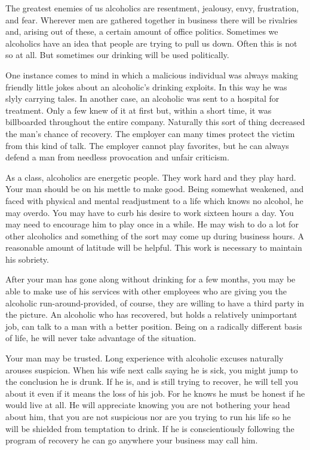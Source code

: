 \begin{biblechapter}
The greatest enemies of us alcoholics are resentment, jealousy, envy, frustration, and fear.  Wherever men are gathered together in business there will be rivalries and, arising out of these, a certain amount of office politics.  Sometimes we alcoholics have an idea that people are trying to pull us down.  Often this is not so at all.  But sometimes our drinking will be used politically.

One instance comes to mind in which a malicious individual was always making friendly little jokes about an alcoholic's drinking exploits.  In this way he was slyly carrying tales.  In another case, an alcoholic was sent to a hospital for treatment.  Only a few knew of it at first but, within a short time, it was billboarded throughout the entire company.  Naturally this sort of thing decreased the man's chance of recovery.  The employer can many times protect the victim from this kind of talk.  The employer cannot play favorites, but he can always defend a man from needless provocation and unfair criticism.

As a class, alcoholics are energetic people.  They work hard and they play hard.  Your man should be on his mettle to make good.  Being somewhat weakened, and faced with physical and mental readjustment to a life which knows no alcohol, he may overdo.  You may have to curb his desire to work sixteen hours a day.  You may need to encourage him to play once in a while.  He may wish to do a lot for other alcoholics and something of the sort may come up during business hours.  A reasonable amount of latitude will be helpful.  This work is necessary to maintain his sobriety.

After your man has gone along without drinking for a few months, you may be able to make use of his services with other employees who are giving you the alcoholic run-around-provided, of course, they are willing to have a third party in the picture.  An alcoholic who has recovered, but holds a relatively unimportant job, can talk to a man with a better position.  Being on a radically different basis of life, he will never take advantage of the situation.

Your man may be trusted.  Long experience with alcoholic excuses naturally arouses suspicion.  When his wife next calls saying he is sick, you might jump to the conclusion he is drunk.  If he is, and is still trying to recover, he will tell you about it even if it means the loss of his job.  For he knows he must be honest if he would live at all.  He will appreciate knowing you are not bothering your head about him, that you are not suspicious nor are you trying to run his life so he will be shielded from temptation to drink.  If he is conscientiously following the program of recovery he can go anywhere your business may call him.


\end{biblechapter}
